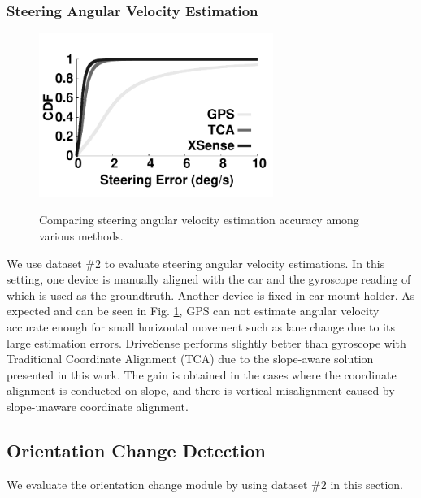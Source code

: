 \subsubsection{Steering Angular Velocity Estimation}


\begin{figure}[!htbp]
\begin{center}
\includegraphics[width=3.0in,angle=0]{Figs/DriveSense/evaluation/evaluation_steering.pdf}
\vspace{-0.2cm}
\caption{Comparing steering angular velocity estimation accuracy among various methods. }
\vspace{-0.3cm}
\label{xsense_steering}
\end{center}
\end{figure}

We use dataset $\#2$ to evaluate steering angular velocity 
estimations. 
In this setting, one device is manually aligned with
the car and the gyroscope reading of which is used
as the groundtruth. 
Another device is fixed in car mount holder.    
As expected and can be seen in Fig. \ref{xsense_steering}, 
GPS can not estimate angular velocity accurate enough
for small horizontal movement such as lane change due to
its large estimation errors. 
DriveSense performs slightly better than gyroscope with 
Traditional Coordinate Alignment (TCA) due to 
the slope-aware solution presented in this work. 
The gain is obtained in the cases where the coordinate
alignment is conducted on slope, and there is vertical
misalignment caused by slope-unaware coordinate alignment. 




\subsection{Orientation Change Detection}

We evaluate the orientation change module
by using dataset $\#2$ in this section. 


